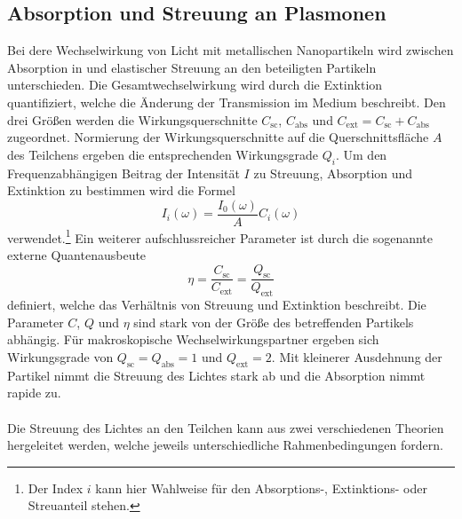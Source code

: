 \subsection{Absorption und Streuung an Plasmonen}
Bei dere Wechselwirkung von Licht mit metallischen Nanopartikeln wird zwischen Absorption in und elastischer Streuung an den beteiligten Partikeln unterschieden. Die Gesamtwechselwirkung wird durch die Extinktion quantifiziert, welche die Änderung der Transmission im Medium beschreibt.
Den drei Größen werden die Wirkungsquerschnitte $C_{\text{sc}}$, $C_{\text{abs}}$ und $C_{\text{ext}} = C_{\text{sc}} + C_{\text{abs}}$ zugeordnet.
Normierung der Wirkungsquerschnitte auf die Querschnittsfläche $A$ des Teilchens ergeben die entsprechenden Wirkungsgrade $Q_i$. Um den Frequenzabhängigen Beitrag der Intensität $I$ zu Streuung, Absorption und Extinktion zu bestimmen wird die Formel
\begin{equation}
  I_i(\omega) = \frac{I_0(\omega)}{A} C_i(\omega)
  \label{eqn:intensität}
\end{equation}
verwendet.\footnote{Der Index $i$ kann hier Wahlweise für den Absorptions-, Extinktions- oder Streuanteil stehen.} Ein weiterer aufschlussreicher Parameter ist durch die sogenannte externe Quantenausbeute
\begin{equation}
  \eta = \frac{C_{\text{sc}}}{C_{\text{ext}}} = \frac{Q_{\text{sc}}}{Q_{\text{ext}}}
\end{equation}
definiert, welche das Verhältnis von Streuung und Extinktion beschreibt. Die Parameter $C$, $Q$ und $\eta$ sind stark von der Größe des betreffenden Partikels abhängig. Für makroskopische Wechselwirkungspartner ergeben sich Wirkungsgrade von $Q_{\text{sc}} = {Q_{\text{abs}}} = 1$ und $Q_{\text{ext}} = 2$. Mit kleinerer Ausdehnung der Partikel nimmt die Streuung des Lichtes stark ab und die Absorption nimmt rapide zu.\\
\\
Die Streuung des Lichtes an den Teilchen kann aus zwei verschiedenen Theorien hergeleitet werden, welche jeweils unterschiedliche Rahmenbedingungen fordern.
